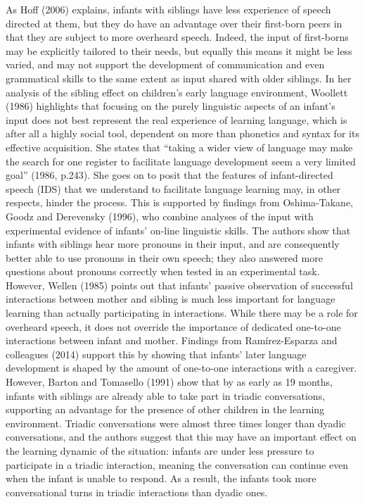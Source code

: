 \documentclass[
  english,
  man,floatsintext]{apa6}
\begin{document}
As Hoff (2006) explains, infants with siblings have less experience of speech directed at them, but they do have an advantage over their first-born peers in that they are subject to more overheard speech. Indeed, the input of first-borns may be explicitly tailored to their needs, but equally this means it might be less varied, and may not support the development of communication and even grammatical skills to the same extent as input shared with older siblings. In her analysis of the sibling effect on children's early language environment, Woollett (1986) highlights that focusing on the purely linguistic aspects of an infant's input does not best represent the real experience of learning language, which is after all a highly social tool, dependent on more than phonetics and syntax for its effective acquisition. She states that \enquote{taking a wider view of language may make the search for one register to facilitate language development seem a very limited goal} (1986, p.243). She goes on to posit that the features of infant-directed speech (IDS) that we understand to facilitate language learning may, in other respects, hinder the process. This is supported by findings from Oshima-Takane, Goodz and Derevensky (1996), who combine analyses of the input with experimental evidence of infants' on-line linguistic skills. The authors show that infants with siblings hear more pronouns in their input, and are consequently better able to use pronouns in their own speech; they also answered more questions about pronouns correctly when tested in an experimental task. However, Wellen (1985) points out that infants' passive observation of successful interactions between mother and sibling is much less important for language learning than actually participating in interactions. While there may be a role for overheard speech, it does not override the importance of dedicated one-to-one interactions between infant and mother. Findings from Ramírez-Esparza and colleagues (2014) support this by showing that infants' later language development is shaped by the amount of one-to-one interactions with a caregiver. However, Barton and Tomasello (1991) show that by as early as 19 months, infants with siblings are already able to take part in triadic conversations, supporting an advantage for the presence of other children in the learning environment. Triadic conversations were almost three times longer than dyadic conversations, and the authors suggest that this may have an important effect on the learning dynamic of the situation: infants are under less pressure to participate in a triadic interaction, meaning the conversation can continue even when the infant is unable to respond. As a result, the infants took more conversational turns in triadic interactions than dyadic ones.
\end{document}
